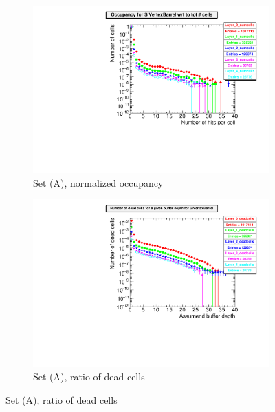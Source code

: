 \begin{figure}
  \begin{subfigure}[b]{0.49\textwidth}
   \centering
    \includegraphics[width=\textwidth]{Figures/Pairs/Appendix/occupancy_numcells_SiVertexBarrel_ILC250_setA.pdf}
   \caption{Set (A), normalized occupancy}
   \end{subfigure}
   \hfill
    \begin{subfigure}[b]{0.49\textwidth}
   \centering
    \includegraphics[width=\textwidth]{Figures/Pairs/Appendix/occupancy_deadcells_SiVertexBarrel_ILC250_setA.pdf}
   \caption{Set (A), ratio of dead cells}
   \end{subfigure}
     \end{figure}
